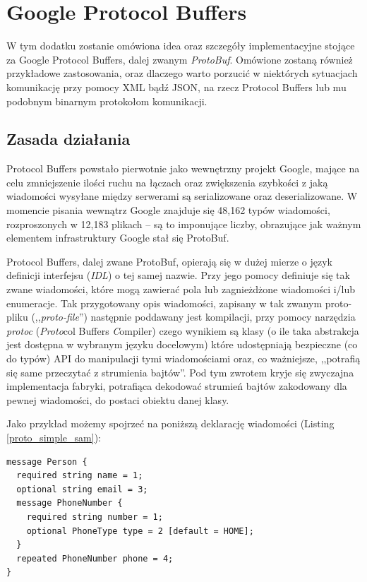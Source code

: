 \chapter{Google Protocol Buffers}
\label{cha:appendixA}
W tym dodatku zostanie omówiona idea oraz szczegóły implementacyjne stojące za Google Protocol Buffers, dalej zwanym \textit{ProtoBuf}.
Omówione zostaną również przykładowe zastosowania, oraz dlaczego warto porzucić w niektórych sytuacjach komunikację przy pomocy
XML bądź JSON, na rzecz Protocol Buffers lub mu podobnym binarnym protokołom komunikacji.

\section{Zasada działania}
\label{sec:protobuf_history}

Protocol Buffers powstało pierwotnie jako wewnętrzny projekt Google, mające na celu zmniejszenie ilości ruchu
na łączach oraz zwiększenia szybkości z jaką wiadomości wysyłane między serwerami są serializowane oraz deserializowane.
W momencie pisania wewnątrz Google znajduje się 48,162 typów wiadomości, rozproszonych w 12,183 plikach -- są to imponujące liczby,
obrazujące jak ważnym elementem infrastruktury Google stał się ProtoBuf. \cite{protobuf}

Protocol Buffers, dalej zwane ProtoBuf, opierają się w dużej mierze o język definicji interfejsu (\textit{IDL}) o tej samej nazwie.
Przy jego pomocy definiuje się tak zwane wiadomości, które mogą zawierać pola lub zagnieżdżone wiadomości i/lub enumeracje.
Tak przygotowany opis wiadomości, zapisany w tak zwanym proto-pliku (,,\textit{proto-file}'') następnie poddawany jest kompilacji,
przy pomocy narzędzia \textit{protoc} (\textit{Proto}col Buffers \textit{C}ompiler) czego wynikiem są klasy (o ile taka abstrakcja jest dostępna
w wybranym języku docelowym) które udostępniają bezpieczne (co do typów) API do manipulacji tymi wiadomościami oraz, co ważniejsze, 
,,potrafią się same przeczytać z strumienia bajtów''. Pod tym zwrotem kryje się zwyczajna implementacja fabryki, potrafiąca dekodować 
strumień bajtów zakodowany dla pewnej wiadomości, do postaci obiektu danej klasy.

\newpage
Jako przykład możemy spojrzeć na poniższą deklarację wiadomości (Listing \ref{proto_simple_sam}):
\begin{lstlisting}[label={proto_simple_sam}]
message Person {
  required string name = 1;
  optional string email = 3;
  message PhoneNumber {
    required string number = 1;
    optional PhoneType type = 2 [default = HOME];
  }
  repeated PhoneNumber phone = 4;
}
\end{lstlisting}


